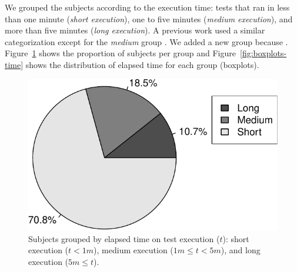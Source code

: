 


We grouped the subjects according to the execution time: tests that
ran in less than one minute (\emph{short execution}), one to five
minutes (\emph{medium execution}), and more than five minutes
(\emph{long execution}). A previous work used a similar categorization
except for the \emph{medium} group \cite{gligoric-etal-issta2015}.  We
added a new group because .  Figure~\ref{fig:piechart-time} shows the proportion
of subjects per group and Figure~\ref{fig:boxplots-time} shows the
distribution of elapsed time for each group (boxplots).


\begin{figure}[h!]
    \centering
    \begin{minipage}{2in}%
    \includegraphics[width=\textwidth]{plots/piechart-timecost.pdf}
    \end{minipage}%
    \caption{\label{fig:piechart-time} Subjects grouped by elapsed time on test
    execution ($t$): short execution ($t < 1m$), medium execution ($1m \leq t <
    5m$), and long execution ($5m \leq t$).}
\end{figure}


